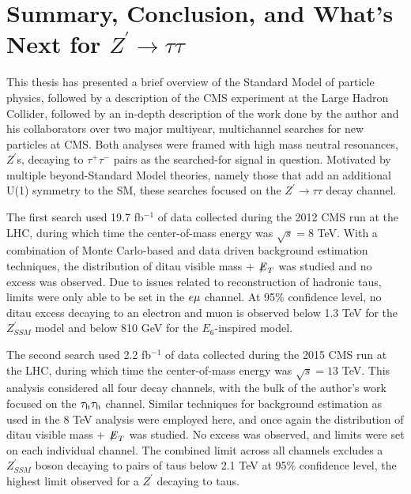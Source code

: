 \chapter{Summary, Conclusion, and What's Next for $Z^\prime\to\tau\tau$}

This thesis has presented a brief overview of the Standard Model of particle physics, followed by a description of the CMS experiment at the Large Hadron Collider, followed by an in-depth description of the work done by the author and his collaborators over two major multiyear, multichannel searches for new particles at CMS. Both analyses were framed with high mass neutral resonances, $Z^\prime$s, decaying to $\tau^+\tau^-$ pairs as the searched-for signal in question. Motivated by multiple beyond-Standard Model theories, namely those that add an additional U(1) symmetry to the SM, these searches focused on the $Z^\prime\to\tau\tau$ decay channel. 

The first search used 19.7 fb$^{-1}$ of data collected during the 2012 CMS run at the LHC, during which time the center-of-mass energy was $\sqrt{s} = 8$ TeV. With a combination of Monte Carlo-based and data driven background estimation techniques, the distribution of ditau visible mass + ${\not\mathrel{E}}_T$ was studied and no excess was observed. Due to issues related to reconstruction of hadronic taus, limits were only able to be set in the $e\mu$ channel. At 95\% confidence level, no ditau excess decaying to an electron and muon is observed below 1.3 TeV for the $Z^\prime_{SSM}$ model and below 810 GeV for the $E_6$-inspired model.

The second search used 2.2 fb$^{-1}$ of data collected during the 2015 CMS run at the LHC, during which time the center-of-mass energy was $\sqrt{s} = 13$ TeV. This analysis considered all four decay channels, with the bulk of the author's work focused on the $\tau_{\textrm{h}}\tau_{\textrm{h}}$ channel. Similar techniques for background estimation as used in the 8 TeV analysis were employed here, and once again the distribution of ditau visible mass + ${\not\mathrel{E}}_T$ was studied. No excess was observed, and limits were set on each individual channel. The combined limit across all channels excludes a $Z^\prime_{SSM}$ boson decaying to pairs of taus below 2.1 TeV at 95\% confidence level, the highest limit observed for a $Z^\prime$ decaying to taus.

